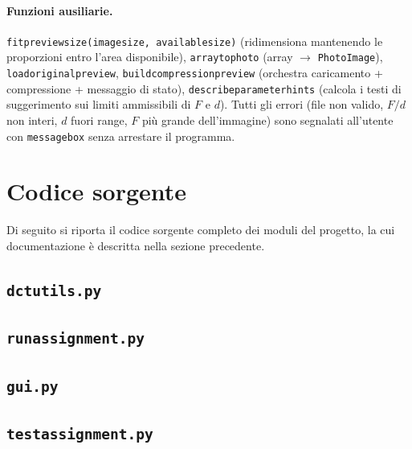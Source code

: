 \documentclass[11pt,a4paper]{article}
\makeatletter
\let\@origtexttt\texttt
\renewcommand{\texttt}[1]{{\def\_{\textunderscore\discretionary{}{}{}}\@origtexttt{#1}}}
\makeatother
\begin{document}
\paragraph{Funzioni ausiliarie.}
\texttt{fit\_preview\_size(image\_size, available\_size)} (ridimensiona
mantenendo le proporzioni entro l'area disponibile),
\texttt{array\_to\_photo} (array $\to$ \texttt{PhotoImage}),
\texttt{load\_original\_preview}, \texttt{build\_compression\_preview}
(orchestra caricamento + compressione + messaggio di stato),
\texttt{describe\_parameter\_hints} (calcola i testi di suggerimento sui limiti
ammissibili di $F$ e $d$). Tutti gli errori (file non valido, $F/d$ non interi,
$d$ fuori range, $F$ più grande dell'immagine) sono segnalati all'utente con
\texttt{messagebox} senza arrestare il programma.


\appendix
\section{Codice sorgente}\label{app:codice}

Di seguito si riporta il codice sorgente completo dei moduli del
progetto, la cui documentazione è descritta nella sezione precedente.

\subsection{\texttt{dct\_utils.py}}


\subsection{\texttt{run\_assignment.py}}


\subsection{\texttt{gui.py}}


\subsection{\texttt{test\_assignment.py}}

\end{document}
